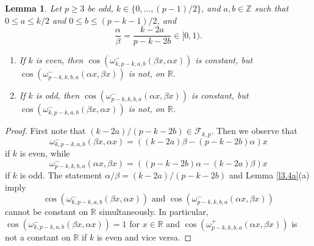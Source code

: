\documentclass[12pt, reqno]{amsart}
\theoremstyle{plain}
\newtheorem{lemma}[theorem]{Lemma}
\newtheorem{corollary}[theorem]{Corollary}
\theoremstyle{definition}
\begin{document}
\begin{lemma}\label{l3.8}
    Let $p\geq3$ be odd, $k\in\{0,\ldots,(p-1)/2\}$, and $a,b\in\mathbb{Z}$ such that $0\leq a\leq k/2$ and $0\leq b\leq (p-k-1)/2$, and 
    \[\frac{\alpha}{\beta}=\frac{k-2a}{p-k-2b}\in[0,1).\]
    \begin{enumerate}
        \item[(a)] If $k$ is even, then $\cos(\omega^-_{k,p-k,a,b}(\beta x,\alpha x))$ is constant, but $\cos(\omega^-_{p-k,k,b,a}(\alpha x,\beta x))$ is not, on $\mathbb{R}$.
        \item[(b)] If $k$ is odd, then $\cos(\omega^-_{p-k,k,b,a}(\alpha x,\beta x))$ is constant, but $\cos(\omega^-_{k,p-k,a,b}(\beta x,\alpha x))$ is not, on $\mathbb{R}$.
    \end{enumerate}
\end{lemma}
\begin{proof}
    First note that $(k-2a)/(p-k-2b)\in\mathcal{F}_{k, p}$.
    Then we observe that
    \[\omega^-_{k,p-k,a,b}(\beta x,\alpha x)=((k-2a)\beta-(p-k-2b)\alpha)x\]
    if $k$ is even, while
    \[\omega^-_{p-k,k,b,a}(\alpha x,\beta x)=((p-k-2b)\alpha-(k-2a)\beta)x\]
    if $k$ is odd. The statement $\alpha/\beta=(k-2a)/(p-k-2b)$ and Lemma \ref{l3.4a}(a) imply \[\cos(\omega^-_{k,p-k,a,b}(\beta x,\alpha x)) \text{ and } \cos(\omega^-_{p-k,k,b,a}(\alpha x,\beta x))\] cannot be constant on $\mathbb{R}$ simultaneously. In particular,
    $\cos(\omega^-_{k,p-k,a,b}(\beta x,\alpha x))=1$
    for $x\in\mathbb{R}$ and $\cos(\omega^+_{p-k,k,b,a}(\alpha x,\beta x))$ is not a constant on $\mathbb{R}$ if $k$ is even and vice versa. 
\end{proof}







\end{document}
